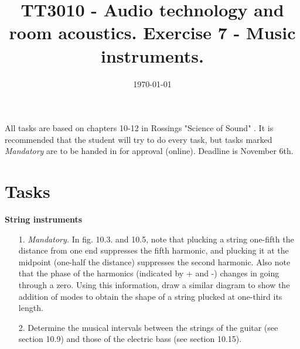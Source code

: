 \documentclass{article}
\title{TT3010 - Audio technology and room acoustics. \newline Exercise 7 - Music instruments.}
\date{\today}
\begin{document}
\maketitle

All tasks are based on chapters 10-12 in Rossings "Science of Sound" \cite{rossing}. 
It is recommended that the student will try to do every task, but tasks marked \textit{Mandatory} are to be handed in for approval (online). Deadline is November 6th.

\section*{Tasks}
  {\bf \Large String instruments}
\begin{itemize}
  
    \item[1.] \textit{Mandatory.} In fig. 10.3. and 10.5, note that plucking a string one-fifth the distance from one end suppresses the fifth harmonic, and plucking it at the midpoint (one-half the distance) suppresses the second harmonic. Also note that the phase of the harmonics (indicated by + and -) changes in going through a zero. Using this information, draw a similar diagram to show the addition of modes  to obtain the shape of a string plucked at one-third its length.
    

    
     
    \item[2.] Determine the musical intervals between the strings of the guitar (see section 10.9) and those of the electric bass (see section 10.15).

\end{itemize}
\end{document}
